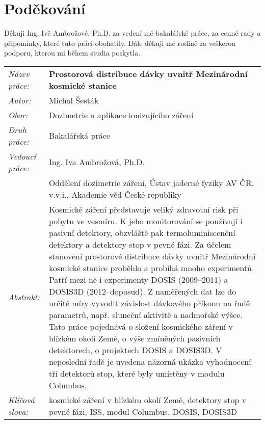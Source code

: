 \section*{Poděkování}
Děkuji Ing. Ivě Ambrožové, Ph.D. za vedení mé bakalářské práce, za cenné rady a připomínky, které tuto práci obohatily. Dále děkuji mé rodině za veškerou podporu, kterou mi během studia poskytla.
\newpage
\begin{tabularx}{\textwidth}{>{\itshape}l X}
  Název práce: & \textbf{Prostorová distribuce dávky uvnitř Mezinárodní kosmické stanice}\\
  Autor: & Michal Šesták\\
  Obor: & Dozimetrie a aplikace ionizujícího záření\\
  Druh práce: & Bakalářská práce\\
  Vedoucí práce: & Ing. Iva Ambrožová, Ph.D.\\ 
               & Oddělení dozimetrie záření, Ústav jaderné fyziky AV ČR, v.v.i., Akademie věd České republiky\\
  Abstrakt: & Kosmické záření představuje veliký zdravotní risk při pobytu ve vesmíru. K jeho monitorování se používají i pasivní detektory, obzvláště pak termoluminiscenční detektory a detektory stop v pevné fázi. Za účelem stanovení prostorové distribuce dávky uvnitř Mezinárodní kosmické stanice proběhlo a probíhá mnoho experimentů. Patří mezi ně i experimenty DOSIS (2009--2011) a DOSIS3D (2012--doposud). Z naměřených dat lze do určité míry vyvodit závislost dávkového příkonu na řadě parametrů, např. sluneční aktivitě a nadmořské výšce. 
  Tato práce pojednává o složení kosmického záření v blízkém okolí Země, o výše zmíněných pasivních detektorech, o projektech DOSIS a DOSIS3D. V neposlední řadě je uvedena názorná ukázka vyhodnocení tří detektorů stop, které byly umístěny v modulu Columbus. \\
  Klíčová slova: & kosmické záření v blízkém okolí Země, detektory stop v pevné fázi, ISS, modul Columbus, DOSIS, DOSIS3D
\end{tabularx}
\newpage
